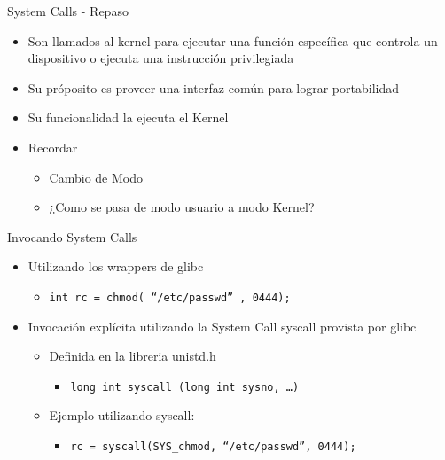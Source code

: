 \begin{frame}{System Calls - Repaso}
  \begin{itemize}
  \item Son llamados al kernel para ejecutar una función específica que controla un dispositivo o ejecuta una instrucción privilegiada 
  \item Su próposito es proveer una interfaz común para lograr portabilidad
  \item Su funcionalidad la ejecuta el Kernel   
  \item Recordar
  \begin{itemize}
    \item Cambio de Modo
    \item ¿Como se pasa de modo usuario a modo Kernel?
  \end{itemize} 

  \end{itemize}
 
\end{frame}

\begin{frame}{Invocando System Calls}
  \begin{itemize}
  \item Utilizando los wrappers de glibc
         \begin{itemize}
            \item \texttt{int rc = chmod( ``/etc/passwd'' , 0444);}
         \end{itemize}
  \item Invocación explícita utilizando la System Call \alert{syscall} provista por glibc
         \begin{itemize}
            \item Definida en la libreria unistd.h
            \begin{itemize}
            \item \texttt{long int syscall (long int sysno, …) }
	    \end{itemize} 
	    \item Ejemplo utilizando syscall: 
              \begin{itemize}
                \item \texttt{rc = syscall(SYS\_chmod, ``/etc/passwd'', 0444);}
              \end{itemize}
         \end{itemize} 
  \end{itemize}
\end{frame}

